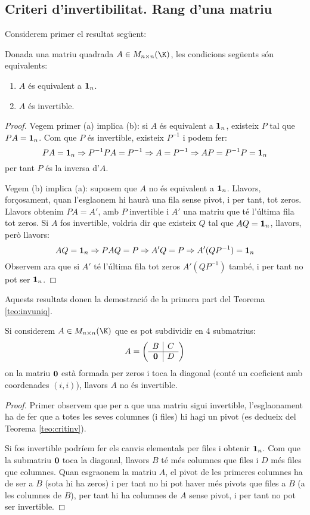 \subsection{Criteri d'invertibilitat. Rang d'una matriu}
Considerem primer el resultat següent:
\begin{teorema}\label{teo:critinv}
	Donada una matriu quadrada $A \in M_{n\times n}(\K)$, les condicions següents són equivalents:
	\begin{enumerate}[\rm (a)]
		\item $A$ és equivalent a $\mathbf{1}_n$.
		\item $A$ és invertible.
	\end{enumerate}
\end{teorema}
\begin{proof}
	Vegem primer (a) implica (b): si $A$ és equivalent a $\mathbf{1}_n$, existeix $P$ tal que $PA=\mathbf{1}_n$. Com que $P$ és invertible, existeix $P^{-1}$ i podem fer:
	$$PA=\mathbf{1}_n \Rightarrow P ^{-1}PA=P^{-1} \Rightarrow A=P^{-1} \Rightarrow AP = P^{-1}P=\mathbf{1}_n$$
	per tant $P$ és la inversa d'$A$.
	
	Vegem (b) implica (a): suposem que $A$ no és equivalent a $\mathbf{1}_n$. Llavors, forçosament, quan l'esglaonem hi haurà una fila sense pivot, i per tant, tot zeros. Llavors obtenim $PA=A'$, amb $P$ invertible i $A'$ una matriu que té l'última fila tot zeros. Si $A$ fos invertible, voldria dir que existeix $Q$ tal que $AQ=\mathbf{1}_n$, llavors, però llavors:
	$$
	AQ=\mathbf{1}_n \Rightarrow PAQ=P \Rightarrow A'Q=P \Rightarrow A'(QP^{-1})=\mathbf{1}_n
	$$
	Observem ara que si $A'$ té l'última fila tot zeros $A'(QP^{-1})$ també, i per tant no pot ser $\mathbf{1}_n$.
\end{proof}
\begin{observacio}\label{obs:invuniq}
	Aquests resultats donen la demostració de la primera part del Teorema \ref{teo:invuniq}.
\end{observacio}
\begin{observacio}\label{obs:noinv}
	Si considerem $A \in M_{n\times n}(\K)$ que es pot subdividir en 4 submatrius:
	$$
	A=\left(\begin{array}{c|c}
	B & C \\ \hline \mathbf{0} & D
	\end{array}\right)
	$$ 
	on la matriu $\mathbf{0}$ està formada per zeros i toca la diagonal (conté un coeficient amb coordenades $(i,i)$), llavors $A$ no és invertible.
\end{observacio}
\begin{proof}
	Primer observem que per a que una matriu sigui invertible, l'esglaonament ha de fer que a totes les seves columnes (i files) hi hagi un pivot (es dedueix del Teorema \ref{teo:critinv}).
	
	Si fos invertible podríem fer els canvis elementals per files i obtenir $\mathbf{1}_n$. Com que la submatriu $\mathbf{0}$ toca la diagonal, llavors $B$ té més columnes que files i $D$ més files que columnes. Quan esgraonem la matriu $A$, el pivot de les primeres columnes ha de ser a $B$ (sota hi ha zeros) i per tant no hi pot haver més pivots que files a $B$ (a les columnes de $B$), per tant hi ha columnes de $A$ sense pivot, i per tant no pot ser invertible.
\end{proof}

